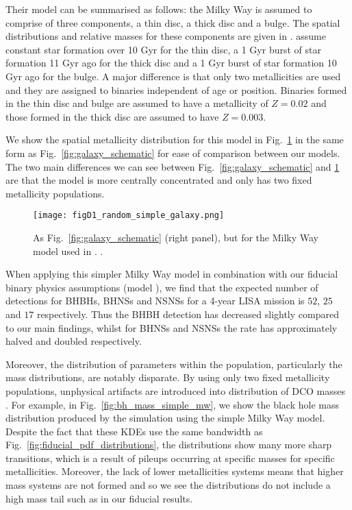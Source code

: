 Their model can be summarised as follows: the Milky Way is assumed to comprise of three components, a thin disc, a thick disc and a bulge. The spatial distributions and relative masses for these components are given in \citet{McMillan+2011}. \citet{Breivik+2020} assume constant star formation over 10 Gyr for the thin disc, a 1 Gyr burst of star formation 11 Gyr ago for the thick disc and a 1 Gyr burst of star formation 10 Gyr ago for the bulge. A major difference is that only two metallicities are used and they are assigned to binaries independent of age or position. Binaries formed in the thin disc and bulge are assumed to have a metallicity of $Z = 0.02$ and those formed in the thick disc are assumed to have $Z = 0.003$.

We show the spatial metallicity distribution for this model in Fig.~\ref{fig:simple_mw} in the same form as Fig.~\ref{fig:galaxy_schematic} for ease of comparison between our models. The two main differences we can see between Fig.~\ref{fig:galaxy_schematic} and \ref{fig:simple_mw} are that the \citet{Breivik+2020} model is more centrally concentrated and only has two fixed metallicity populations.

\begin{figure}[htb]
    \centering
    \texttt{[image: figD1\_random\_simple\_galaxy.png]}
    \caption{As Fig.~\ref{fig:galaxy_schematic} (right panel), but for the Milky Way model used in \citet{Breivik+2020}.  \href{https://github.com/TomWagg/detecting-DCOs-in-LISA/blob/main/paper/figures/figD1_random_simple_galaxy.png}{\faFileImage} \href{https://github.com/TomWagg/detecting-DCOs-in-LISA/blob/main/paper/figure_notebooks/galaxy_creation_station.ipynb}{\faBook}.}
    \label{fig:simple_mw}
\end{figure}

When applying this simpler Milky Way model in combination with our fiducial binary physics assumptions (model \modFid{}), we find that the expected number of detections for BHBHs, BHNSs and NSNSs for a 4-year LISA mission is $52$, $25$ and $17$ respectively. Thus the BHBH detection has decreased slightly compared to our main findings, whilst for BHNSs and NSNSs the rate has approximately halved and doubled respectively.

Moreover, the distribution of parameters within the population, particularly the mass distributions, are notably disparate. By using only two fixed metallicity populations, unphysical artifacts are introduced into distribution of DCO masses \citep[e.g.\ ][]{Dominik+2015, Neijssel+2019, Kummer_thesis}. For example, in Fig.~\ref{fig:bh_mass_simple_mw}, we show the black hole mass distribution produced by the simulation using the simple Milky Way model. Despite the fact that these KDEs use the same bandwidth as Fig.~\ref{fig:fiducial_pdf_distributions}, the distributions show many more sharp transitions, which is a result of pileups occurring at specific masses for specific metallicities. Moreover, the lack of lower metallicities systems means that higher mass systems are not formed and so we see the distributions do not include a high mass tail such as in our fiducial results.

